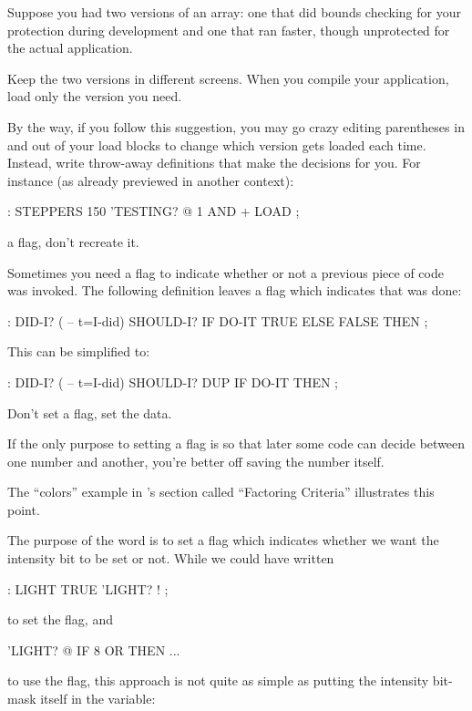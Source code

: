 Suppose you had two versions of an array: one that did bounds
checking for your protection during development and one that ran faster,
though unprotected for the actual application.

Keep the two versions in different screens. When you compile your
application, load only the version you need.

By the way, if you follow this suggestion, you may go crazy editing
parentheses in and out of your load blocks to change which version gets
loaded each time. Instead, write throw-away definitions that make the
decisions for you. For instance (as already previewed in another context):

\begin{Code}
: STEPPERS   150  'TESTING? @  1 AND +  LOAD ;
\end{Code}
\begin{tip}
 a flag, don't recreate it.
\end{tip}
Sometimes you need a flag to indicate whether or not a previous piece of
code was invoked. The following definition leaves a flag which indicates
that  was done:

\begin{Code}
: DID-I?  ( -- t=I-did)
   SHOULD-I?  IF  DO-IT  TRUE  ELSE  FALSE  THEN ;
\end{Code}
This can be simplified to:

\begin{Code}
: DID-I?  ( -- t=I-did)
        SHOULD-I? DUP  IF  DO-IT  THEN ;
\end{Code}
\begin{tip}
Don't set a flag, set the data.
\end{tip}
If the only purpose to setting a flag is so that later some code can decide
between one number and another, you're better off saving the number
itself.

The ``colors'' example in 's section called ``Factoring
Criteria'' illustrates this point.

The purpose of the word  is to set a flag which indicates
whether we want the intensity bit to be set or not. While we could have
written

\begin{Code}
: LIGHT   TRUE 'LIGHT? ! ;
\end{Code}
to set the flag, and

\begin{Code}
'LIGHT? @ IF  8 OR  THEN ...
\end{Code}
to use the flag, this approach is not quite as simple as putting the
intensity bit-mask itself in the variable:

